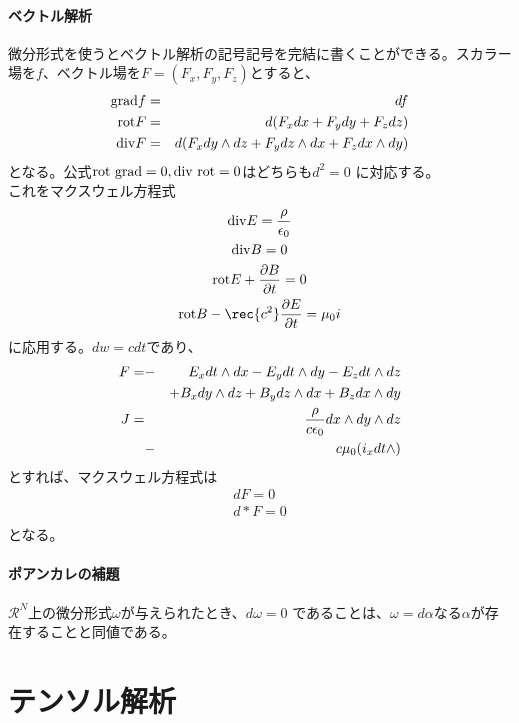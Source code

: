     \paragraph{ベクトル解析}
        微分形式を使うとベクトル解析の記号記号を完結に書くことができる。スカラー
        場を$f$、ベクトル場を$F = (F_x,F_y,F_z)$とすると、
        \begin{eqnarray*}
            {\rm grad}f &=& df\\
            {\rm rot}F &=& d(F_xdx+F_ydy+F_zdz)\\
            {\rm div}F &=& d(F_xdy\wedge dz+F_ydz\wedge dx+F_zdx\wedge dy)
        \end{eqnarray*}
        となる。公式${\rm rot\ grad}=0,{\rm div\ rot}=0$はどちらも$d^2=0$
        に対応する。\\
        これをマクスウェル方程式
        \begin{gather*}
            {\rm div}E = \frac{\rho}{\epsilon_0}\\
            {\rm div}B = 0\\
            {\rm rot}E+\pd[B]{t} = 0\\
            {\rm rot}B-\rec{c^2}\pd[E]{t} = \mu_0 i
        \end{gather*}
        に応用する。$dw = cdt$であり、
        \begin{eqnarray*}
            F = &-&E_xdt\wedge dx-E_ydt\wedge dy-E_zdt\wedge dz\\
                & &+B_xdy\wedge dz+B_ydz\wedge dx+B_zdx\wedge dy\\
            J = & &\frac{\rho}{c\epsilon_0}dx\wedge dy\wedge dz\\
                &-&c\mu_0(i_xdt\wedge)
        \end{eqnarray*}
        とすれば、マクスウェル方程式は
        \begin{eqnarray*}
            dF = 0\\
            d*F = 0\\
        \end{eqnarray*}
        となる。
    \paragraph{ポアンカレの補題}
        $\mathcal{R}^N$上の微分形式$\omega$が与えられたとき、$d\omega = 0$
        であることは、$\omega = d\alpha$なる$\alpha$が存在することと同値である。


\section{テンソル解析}

